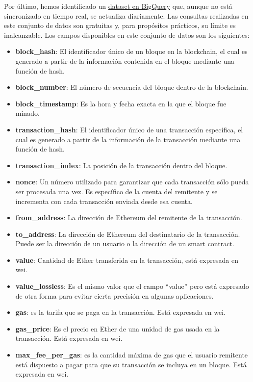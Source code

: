 \documentclass{article}
\begin{document}
Por último, hemos identificado un  \href{https://cloud.google.com/blog/products/data-analytics/ethereum-bigquery-public-dataset-smart-contract-analytics}{dataset en BigQuery} que, aunque no está sincronizado en tiempo real, se actualiza diariamente. Las consultas realizadas en este conjunto de datos son gratuitas y, para propósitos prácticos, su límite es inalcanzable. Los campos disponibles en este conjunto de datos son los siguientes: 
\begin{itemize}
    \item \textbf{block\_hash}: El identificador único de un bloque en la blockchain, el cual es generado a partir de la información contenida en el bloque mediante una función de hash.
    \item \textbf{block\_number}: El número de secuencia del bloque dentro de la blockchain.
    \item \textbf{block\_timestamp}: Es la hora y fecha exacta en la que el bloque fue minado.
    \item \textbf{transaction\_hash}: El identificador único de una transacción específica, el cual es generado a partir de la información de la transacción mediante una función de hash.
    \item \textbf{transaction\_index}: La posición de la transacción dentro del bloque. 
    \item \textbf{nonce}: Un número utilizado para garantizar que cada transacción sólo pueda ser procesada una vez. Es específico de la cuenta del remitente y se incrementa con cada transacción enviada desde esa cuenta.
    \item \textbf{from\_address}: La dirección de Ethereum del remitente de la transacción.
    \item \textbf{to\_address}: La dirección de Ethereum del destinatario de la transacción. Puede ser la dirección de un usuario o la dirección de un smart contract.
    \item \textbf{value}: Cantidad de Ether transferida en la transacción, está expresada en wei.
    \item \textbf{value\_lossless}: Es el mismo valor que el campo “value” pero está expresado de otra forma para evitar cierta precisión en algunas aplicaciones. 
    \item \textbf{gas}: es la tarifa que se paga en la transacción. Está expresada en wei.
    \item \textbf{gas\_price}: Es el precio en Ether de una unidad de gas usada en la transacción. Está expresada en wei.
    \item \textbf{max\_fee\_per\_gas}: es la cantidad máxima de gas que el usuario remitente está dispuesto a pagar para que su transacción se incluya en un bloque. Está expresada en wei.

\end{itemize}
\end{document}
